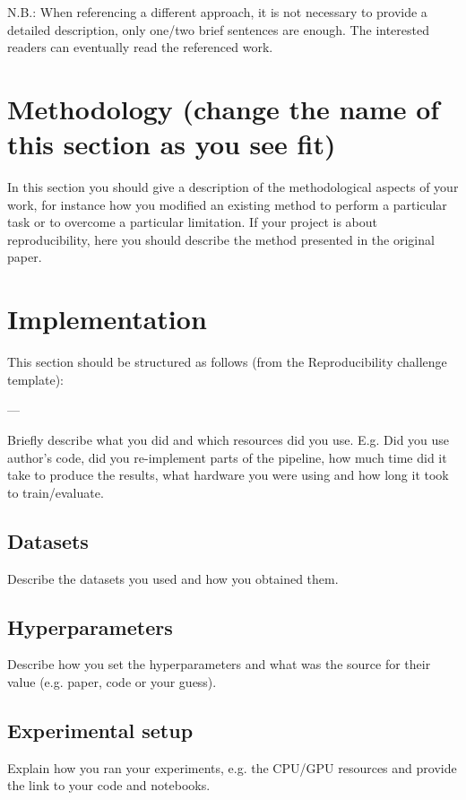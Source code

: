 \documentclass{article}
\begin{document}
	N.B.: When referencing a different approach, it is not necessary to provide a detailed description, 
	only one/two brief sentences are enough. The interested readers can eventually read the referenced 
	work. 
	
	\section{Methodology (change the name of this section as you see fit)}
	
	In this section you should give a description of the methodological aspects of your work, for 
	instance how you modified an existing method to perform a particular task or to overcome a 
	particular limitation. If your project is about reproducibility, here you should describe the method 
	presented in the original paper.
	
	\section{Implementation}
	
	This section should be structured as follows (from the Reproducibility challenge template):
	
	---
	
	Briefly describe what you did and which resources did you use. E.g. Did you use author's code, did 
	you re-implement parts of the pipeline, how much time did it take to produce the results, what 
	hardware you were using and how long it took to train/evaluate. 
	
	\subsection{Datasets}
	Describe the datasets you used and how you obtained them. 
	
	\subsection{Hyperparameters}
	Describe how you set the hyperparameters and what was the source for their value (e.g. paper, code 
	or your guess). 
	
	\subsection{Experimental setup}
	Explain how you ran your experiments, e.g. the CPU/GPU resources and provide the link to your 
	code and notebooks. 
	
\end{document}
